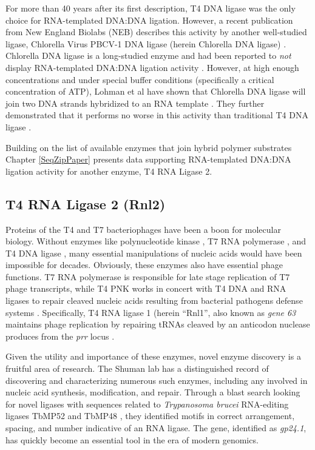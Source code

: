     For more than 40 years after its first description, T4 DNA ligase was the only choice for RNA-templated DNA:DNA ligation. However, a recent publication from New England Biolabs (NEB) describes this activity by another well-studied ligase, Chlorella Virus PBCV-1 DNA ligase (herein Chlorella DNA ligase) \citep{Lohman2013c}. Chlorella DNA ligase is a long-studied enzyme and had been reported to \textit{not} display RNA-templated DNA:DNA ligation activity \citep{Ho1997b,Sriskanda1998c}. However, at high enough concentrations and under special buffer conditions (specifically a critical concentration of ATP), Lohman et al have shown that Chlorella DNA ligase will join two DNA strands hybridized to an RNA template \citep{Lohman2013c}. They further demonstrated that it performs no worse in this activity than traditional T4 DNA ligase \citep{Nilsson2001,Yeakley2002}.

    Building on the list of available enzymes that join hybrid polymer substrates Chapter \ref{SeqZipPaper} presents data supporting RNA-templated DNA:DNA ligation activity for another enzyme, T4 RNA Ligase 2.

  \subsection{T4 RNA Ligase 2 (Rnl2)}\label{Intro:subsec:Rnl2}

    Proteins of the T4 and T7 bacteriophages have been a boon for molecular biology. Without enzymes like polynucleotide kinase \citep{Richardson1965a}, T7 RNA polymerase \citep{Summers1970b}, and T4 DNA ligase \citep{Weiss1967a}, many essential manipulations of nucleic acids would have been impossible for decades. Obviously, these enzymes also have essential phage functions. T7 RNA polymerase is responsible for late stage replication of T7 phage transcripts, while T4 PNK works in concert with T4 DNA and RNA ligases to repair cleaved  nucleic acids resulting from bacterial pathogens defense systems \citep{Wang2002b}. Specifically, T4 RNA ligase 1 (herein ``Rnl1'', also known as \textit{gene 63} maintains phage replication by repairing tRNAs cleaved by an anticodon nuclease produces from the \textit{prr} locus \citep{Amitsur1987d}.

    Given the utility and importance of these enzymes, novel enzyme discovery is a fruitful area of research. The Shuman lab has a distinguished record of discovering and characterizing numerous such enzymes, including any involved in nucleic acid synthesis, modification, and repair. Through a blast search looking for novel ligases with sequences related to \textit{Trypanosoma brucei} RNA-editing ligases TbMP52 and TbMP48 \citep{Ho2002b}, they identified motifs in correct arrangement, spacing, and number indicative of an RNA ligase. The gene, identified as \textit{gp24.1}, has quickly become an essential tool in the era of modern genomics.

